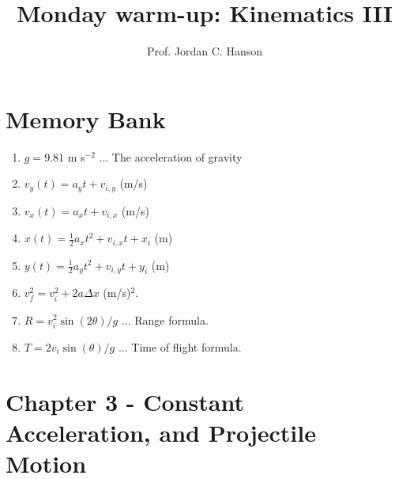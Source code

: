 \documentclass{article}
\begin{document}
\twocolumn

\title{Monday warm-up: Kinematics III}
\author{Prof. Jordan C. Hanson}

\maketitle

\section{Memory Bank}

\begin{enumerate}
\item $g = 9.81$ m s$^{-2}$ ... The acceleration of gravity
\item $v_y(t) = a_y t + v_{i,y}$ (m/s)
\item $v_x(t) = a_x t + v_{i,x}$ (m/s)
\item $x(t) = \frac{1}{2}a_x t^2 + v_{i,x} t + x_{i}$ (m)
\item $y(t) = \frac{1}{2}a_y t^2 + v_{i,y} t + y_{i}$ (m)
\item $v_f^2 = v_i^2 + 2a\Delta x$ (m/s)$^2$.
\item $R = v_i^2 \sin(2\theta)/g$ ... Range formula.
\item $T = 2 v_i \sin(\theta)/g$ ... Time of flight formula.
\end{enumerate}

\section{Chapter 3 - Constant \\ Acceleration, and Projectile \\ Motion}
\end{document}
